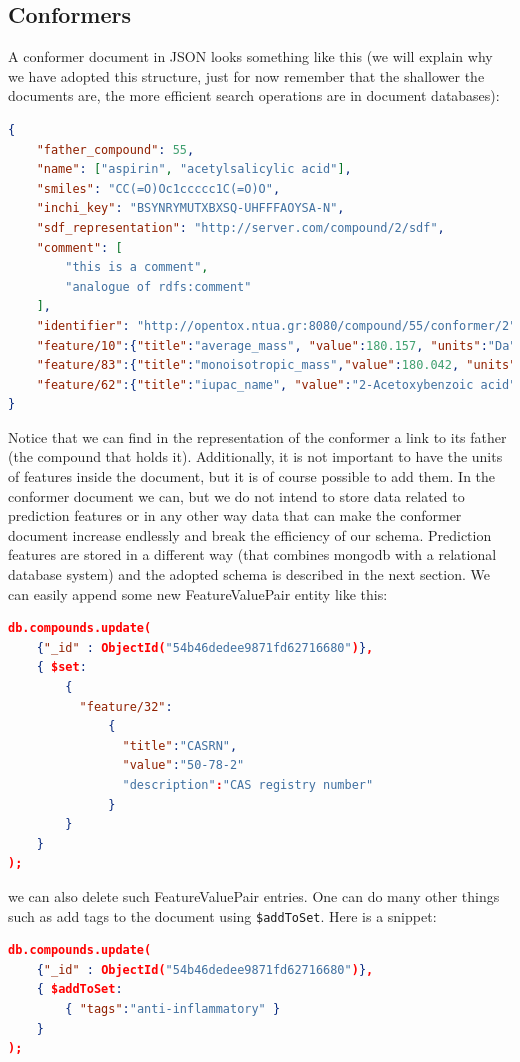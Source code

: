 \subsection{Conformers}
A conformer document in JSON looks something like this 
(we will explain why we have adopted this structure, just for 
now remember that the shallower the documents are, the more 
efficient search operations are in document databases):
\begin{lstlisting}[language=json]
{ 
    "father_compound": 55, 
    "name": ["aspirin", "acetylsalicylic acid"], 
    "smiles": "CC(=O)Oc1ccccc1C(=O)O", 
    "inchi_key": "BSYNRYMUTXBXSQ-UHFFFAOYSA-N", 
    "sdf_representation": "http://server.com/compound/2/sdf", 
    "comment": [ 
        "this is a comment", 
        "analogue of rdfs:comment" 
    ], 
    "identifier": "http://opentox.ntua.gr:8080/compound/55/conformer/2", 
    "feature/10":{"title":"average_mass", "value":180.157, "units":"Da"}, 
    "feature/83":{"title":"monoisotropic_mass","value":180.042, "units":"Da"}, 
    "feature/62":{"title":"iupac_name", "value":"2-Acetoxybenzoic acid"} 
} 
\end{lstlisting}
Notice that we can find in the representation of the conformer a 
link to its father (the compound that holds it). Additionally, it is 
not important to have the units of features inside the document, but 
it is of course possible to add them. In the conformer document we can, 
but we do not intend to store data related to prediction features or 
in any other way data that can make the conformer document increase 
endlessly and break the efficiency of our schema. Prediction features 
are stored in a different way (that combines mongodb with a relational 
database system) and the adopted schema is described in the next section.
%
We can easily append some new FeatureValuePair entity like this:

\begin{lstlisting}[language=json] 
db.compounds.update(
    {"_id" : ObjectId("54b46dedee9871fd62716680")}, 
    { $set: 
        { 
          "feature/32": 
              { 
                "title":"CASRN", 
                "value":"50-78-2"
                "description":"CAS registry number"
              } 
        } 
    }
);
\end{lstlisting}

we can also delete such FeatureValuePair entries. 
One can do many other things such as add tags to the document using 
\texttt{\$addToSet}. Here is a snippet:

\begin{lstlisting}[language=json]
db.compounds.update(  
    {"_id" : ObjectId("54b46dedee9871fd62716680")},  
    { $addToSet:  
        { "tags":"anti-inflammatory" }  
    }  
); 
\end{lstlisting}

